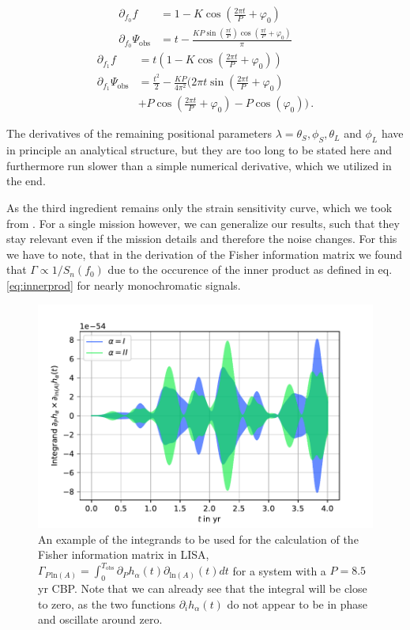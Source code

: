 \documentclass{aa}
\begin{document}
\begin{equation}
\begin{split}
    \partial_{f_0} f &= 1-K \cos \left(\frac{2 \pi  t}{P}+\varphi_0\right) \\
    \partial_{f_0} \Psi_\mathrm{obs} &= t-\frac{K P \sin \left(\frac{\pi  t}{P}\right) \cos \left(\frac{\pi  t}{P}+\varphi_0\right)}{\pi }
\end{split}
\end{equation}
\begin{equation} \label{eq:derivsend}
\begin{split}
    \partial_{f_1} f &= t \left(1-K \cos \left(\frac{2 \pi  t}{P}+\varphi_0\right)\right) \\
    \partial_{f_1} \Psi_\mathrm{obs} &= \frac{t^2}{2}-\frac{K P }{4 \pi ^2} \Bigg(2 \pi  t \sin \left(\frac{2 \pi  t}{P}+\varphi_0\right)\\&+P \cos \left(\frac{2 \pi 
   t}{P}+\varphi_0\right)-P \cos (\varphi_0)\Bigg)\,.
\end{split}
\end{equation}

The derivatives of the remaining positional parameters $\lambda=\theta_S,\phi_S,\theta_L$ and $\phi_L$ have in principle an analytical structure, but they are too long to be stated here and furthermore run slower than a simple numerical derivative, which we utilized in the end.

As the third ingredient remains only the strain sensitivity curve, which we took from \citep{Robson}. For a single mission however, we can generalize our results, such that they stay relevant even if the mission details and therefore the noise changes. For this we have to note, that in the derivation of the Fisher information matrix we found that $\Gamma \propto 1/S_n(f_0)$ due to the occurence of the inner product as defined in eq. \ref{eq:innerprod} for nearly monochromatic signals. 

\begin{figure}
    \centering
    \includegraphics[width=.5\textwidth]{Fisher_integrand.pdf}
    \caption{An example of the integrands to be used for the calculation of the Fisher information matrix in LISA, $\Gamma_{P\, \mathrm{ln}(A)}=\int_0^{T_\mathrm{obs}} \partial_P h_\alpha (t)\partial_{\mathrm{ln}(A)}(t) dt$ for a system with a $P=8.5$ yr CBP. Note that we can already see that the integral will be close to zero, as the two functions $\partial_i h_\alpha (t)$ do not appear to be in phase and oscillate around zero.}
    \label{fig:Fisher_ex}
\end{figure}
\end{document}
